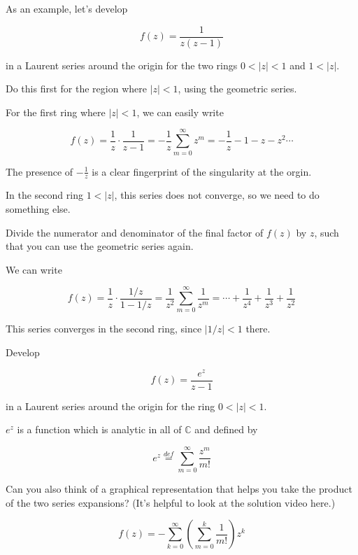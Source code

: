
As an example, let's develop

$$f(z)=\frac{1}{z(z-1)}$$

in a Laurent series around the origin for the two rings $0 < | z | < 1$ and $ 1 < |z|$.

\begin{cue}
Do this first for the region where  $| z | < 1$, using the geometric series.
\end{cue}

For the first ring where $| z | < 1$, we can easily write

$$f(z)=\frac{1}{z} \cdot \frac{1}{z-1} = -\frac{1}{z} \sum_{m=0}^{\infty} z^m =-\frac{1}{z}-1-z-z^2 \cdots$$

The presence of $-\frac{1}{z}$ is a clear fingerprint of the singularity at the orgin.

In the second ring  $ 1 < |z|$, this series does not converge, so we need to do something else.

\begin{cue}
Divide the numerator and denominator of the final factor of $f(z)$ by $z$, such that you can use the geometric series again.
\end{cue}

We can write

$$f(z)=\frac{1}{z} \cdot \frac{1 / z }{1-1/z} = \frac{1}{z^2} \sum_{m=0}^{\infty} \frac{1}{z^m} =\cdots+\frac{1}{z^4}+\frac{1}{z^3} + \frac{1}{z^2}$$

This series converges in the second ring, since $|1/z| < 1$ there.

\pagebreak

\begin{exer}
\label{ex_laurent_1}
Develop

$$f(z)=\frac{e^z}{z-1}$$

in a Laurent series around the origin for the ring $0 < | z | < 1$.

$e^z$ is a function which is analytic in all of $\mathbb{C}$ and defined by

$$e^z \stackrel{def}{=} \sum_{m=0}^{\infty} \frac{z^m}{m!} $$

Can you also think of a graphical representation that helps you take the product of the two series expansions? (It's helpful to look at the solution video here.)

\begin{sol}
$$f(z)= - \sum_{k=0}^{\infty} \left(\sum _{m=0}^k \frac{1}{m!} \right) z^k $$
\end{sol}

\end{exer}

